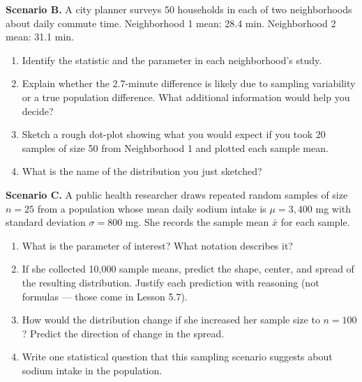 \documentclass[10pt]{article}
\begin{document}
\begin{tcolorbox}[colback=redbg, colframe=black!40, boxrule=0.6pt, arc=2mm,
    left=3mm, right=3mm, top=2mm, bottom=2mm, title=\textbf{Tier A --- Approaching Proficiency}]
\textbf{Scenario B.} A city planner surveys 50 households in each of two
neighborhoods about daily commute time. Neighborhood 1 mean: 28.4 min.
Neighborhood 2 mean: 31.1 min.

\begin{enumerate}
  \item Identify the statistic and the parameter in each neighborhood's study.
  \item Explain whether the 2.7-minute difference is likely due to sampling variability
        or a true population difference. What additional information would help you
        decide? 
  \item Sketch a rough dot-plot showing what you would expect if you took 20 samples of
        size 50 from Neighborhood 1 and plotted each sample mean.

        \vspace{1.0in}
  \item What is the name of the distribution you just sketched? \blank{5cm}
\end{enumerate}
\end{tcolorbox}

\vspace{0.1in}

\begin{tcolorbox}[colback=redbg, colframe=black!40, boxrule=0.6pt, arc=2mm,
    left=3mm, right=3mm, top=2mm, bottom=2mm, title=\textbf{Tier E --- Extension}]
\textbf{Scenario C.} A public health researcher draws repeated random samples of size
$n = 25$ from a population whose mean daily sodium intake is $\mu = 3{,}400$ mg with
standard deviation $\sigma = 800$ mg. She records the sample mean $\bar{x}$ for each
sample.

\begin{enumerate}
  \item What is the parameter of interest? What notation describes it? 
  \item If she collected 10,000 sample means, predict the shape, center, and
        spread of the resulting distribution. Justify each prediction with reasoning
        (not formulas --- those come in Lesson 5.7). 
  \item How would the distribution change if she increased her sample size to $n = 100$?
        Predict the direction of change in the spread. 
  \item Write one statistical question that this sampling scenario suggests about
        sodium intake in the population. 
\end{enumerate}
\end{tcolorbox}
\end{document}
